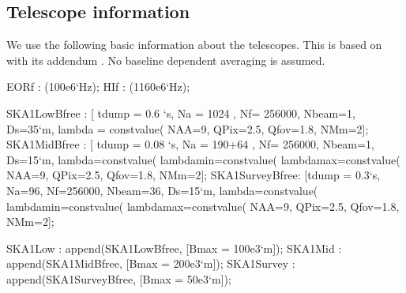 \documentclass[useAMS,usenatbib,referee]{article}
\begin{document}
\subsection{Telescope information}

We use the following basic information about the telescopes. This is
based on \cite{DewdneyDD001-1} with its addendum \cite{McCoolDD003}.
No baseline dependent averaging is assumed.
\begin{maxima}[]
EORf : (100e6`Hz);
HIf : (1160e6`Hz);

SKA1LowBfree : [ tdump = 0.6 `s, Na = 1024 , Nf= 256000, Nbeam=1, Ds=35`m, 
lambda = constvalue(%
NAA=9,
QPix=2.5, Qfov=1.8,
NMm=2];
SKA1MidBfree : [ tdump = 0.08 `s, Na = 190+64 , Nf= 256000, Nbeam=1, Ds=15`m,
lambda=constvalue(%
lambdamin=constvalue(%
lambdamax=constvalue(%
NAA=9,
QPix=2.5, Qfov=1.8,
NMm=2];
SKA1SurveyBfree: [tdump = 0.3`s, Na=96, Nf=256000, Nbeam=36,      Ds=15`m,
lambda=constvalue(%
lambdamin=constvalue(%
lambdamax=constvalue(%
NAA=9,
QPix=2.5, Qfov=1.8,
NMm=2];

SKA1Low : append(SKA1LowBfree, [Bmax = 100e3`m]);
SKA1Mid : append(SKA1MidBfree, [Bmax = 200e3`m]);
SKA1Survey : append(SKA1SurveyBfree, [Bmax = 50e3`m]);


\end{maxima}
\end{document}

